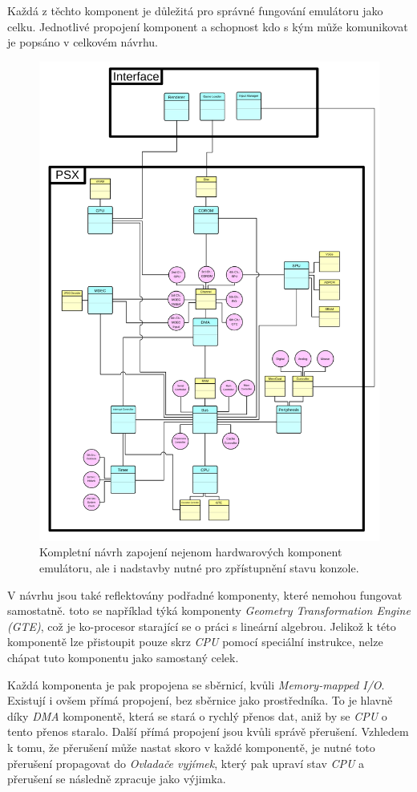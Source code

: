 Každá z těchto komponent je důležitá pro správné fungování emulátoru jako celku.
Jednotlivé propojení komponent a schopnost kdo s kým může komunikovat je popsáno v celkovém návrhu.

\begin{figure}[hbt]
	\centering
	\includegraphics[width=1.0\textwidth]{obrazky-figures/psx-layout.png}
	\caption{Kompletní návrh zapojení nejenom hardwarových komponent emulátoru, ale i nadstavby nutné pro zpřístupnění stavu konzole.}
	\label{psx-layout}
\end{figure}

V návrhu jsou také reflektovány podřadné komponenty, které nemohou fungovat samostatně.
toto se například týká komponenty \textit{Geometry Transformation Engine (GTE)}, což je
ko-procesor starající se o práci s lineární algebrou. Jelikož k této komponentě lze přistoupit
pouze skrz \textit{CPU} pomocí speciální instrukce, nelze chápat tuto komponentu jako samostaný celek.

Každá komponenta je pak propojena se sběrnicí, kvůli \textit{Memory-mapped I/O}. Existují
i ovšem přímá propojení, bez sběrnice jako prostředníka. To je hlavně díky \textit{DMA} komponentě,
která se stará o rychlý přenos dat, aniž by se \textit{CPU} o tento přenos staralo. Další
přímá propojení jsou kvůli správě přerušení. Vzhledem k tomu, že přerušení může nastat skoro v
každé komponentě, je nutné toto přerušení propagovat do \textit{Ovladače vyjímek}, který pak
upraví stav \textit{CPU} a přerušení se následně zpracuje jako výjimka.
